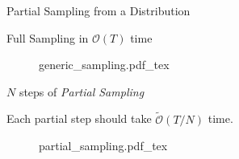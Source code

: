\begin{block}{Partial Sampling from a Distribution}


\begin{alertblock}{Full Sampling in $\mathcal O (T)$ time}

\begin{figure}[h!]\centering
    \def\svgwidth{0.6\columnwidth}
    {generic_sampling.pdf_tex}
\end{figure}

\end{alertblock}


\begin{alertblock}{$N$ steps of \emph{Partial Sampling}}

\begin{center}
Each partial step should take $\tilde{\mathcal O} (T/N)$ time.
\end{center}

\begin{figure}[h!]\centering
    \def\svgwidth{0.9\columnwidth}
    {partial_sampling.pdf_tex}
\end{figure}

\end{alertblock}

\end{block}

